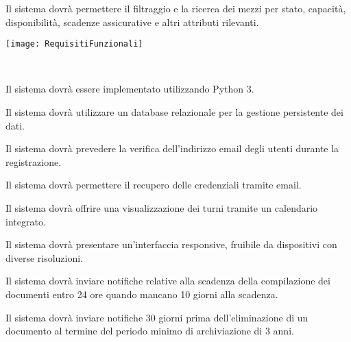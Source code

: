 \documentclass[a4paper]{report}
\begin{document}

Il sistema dovrà permettere il filtraggio e la ricerca dei mezzi per stato, capacità, disponibilità, scadenze assicurative e altri attributi rilevanti.

\begin{figure*}[ht]
    \centering
    \texttt{[image: RequisitiFunzionali]}
\end{figure*}


\vphantom{space}\\[6cm]



Il sistema dovrà essere implementato utilizzando Python 3.


Il sistema dovrà utilizzare un database relazionale per la gestione persistente dei dati.


Il sistema dovrà prevedere la verifica dell'indirizzo email degli utenti durante la registrazione.


Il sistema dovrà permettere il recupero delle credenziali tramite email.



Il sistema dovrà offrire una visualizzazione dei turni tramite un calendario integrato.


Il sistema dovrà presentare un'interfaccia responsive, fruibile da dispositivi con diverse risoluzioni.


Il sistema dovrà inviare notifiche relative alla scadenza della compilazione dei documenti entro 24 ore quando mancano 10 giorni alla scadenza.


Il sistema dovrà inviare notifiche 30 giorni prima dell'eliminazione di un documento al termine del periodo minimo di archiviazione di 3 anni.
\end{document}
